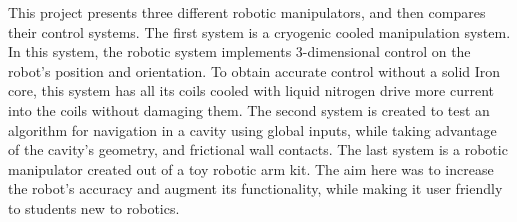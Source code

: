 

This project presents three different robotic manipulators, and then compares their control systems. The first system is a cryogenic cooled manipulation system. In this system, the robotic system implements 3-dimensional control on the robot’s position and orientation. To obtain accurate control without a solid Iron core, this system has all its coils cooled with liquid nitrogen drive more current into the coils without damaging them. The second system is created to test an algorithm for navigation in a cavity using global inputs, while taking advantage of the cavity’s geometry, and frictional wall contacts. The last system is a robotic manipulator created out of a toy robotic arm kit. The aim here was to increase the robot’s accuracy and augment its functionality, while making it user friendly to students new to robotics.